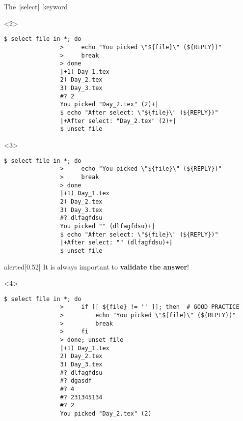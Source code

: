 \begin{frame}[fragile]{The \,\bash|select|\, keyword}
\begin{overlayarea}{\textwidth}{\textheight}
        \begin{onlyenv}<2>
            \begin{lstlisting}[style=MyBash]
                $ select file in *; do
                >     echo "You picked \"${file}\" (${REPLY})"
                >     break
                > done
                |+1) Day_1.tex
                2) Day_2.tex
                3) Day_3.tex
                #? 2
                You picked "Day_2.tex" (2)+|
                $ echo "After select: \"${file}\" (${REPLY})"
                |+After select: "Day_2.tex" (2)+|
                $ unset file
            \end{lstlisting}
        \end{onlyenv}
        \begin{onlyenv}<3>
            \begin{lstlisting}[style=MyBash]
                $ select file in *; do
                >     echo "You picked \"${file}\" (${REPLY})"
                >     break
                > done
                |+1) Day_1.tex
                2) Day_2.tex
                3) Day_3.tex
                #? dlfagfdsu
                You picked "" (dlfagfdsu)+|
                $ echo "After select: \"${file}\" (${REPLY})"
                |+After select: "" (dlfagfdsu)+|
                $ unset file
            \end{lstlisting}
            \medskip
            \begin{varblock}{alerted}[0.52\textwidth]{}
                It is always important to \alert{\textbf{validate the answer}}!
            \end{varblock}
        \end{onlyenv}
        \begin{onlyenv}<4>
            \begin{lstlisting}[style=MyBash]
                $ select file in *; do
                >     if [[ ${file} != '' ]]; then  # GOOD PRACTICE
                >         echo "You picked \"${file}\" (${REPLY})"
                >         break
                >     fi
                > done; unset file
                |+1) Day_1.tex
                2) Day_2.tex
                3) Day_3.tex
                #? dlfagfdsu
                #? dgasdf
                #? 4
                #? 231345134
                #? 2
                You picked "Day_2.tex" (2)
            \end{lstlisting}
        \end{onlyenv}
    \end{overlayarea}
\end{frame}




















